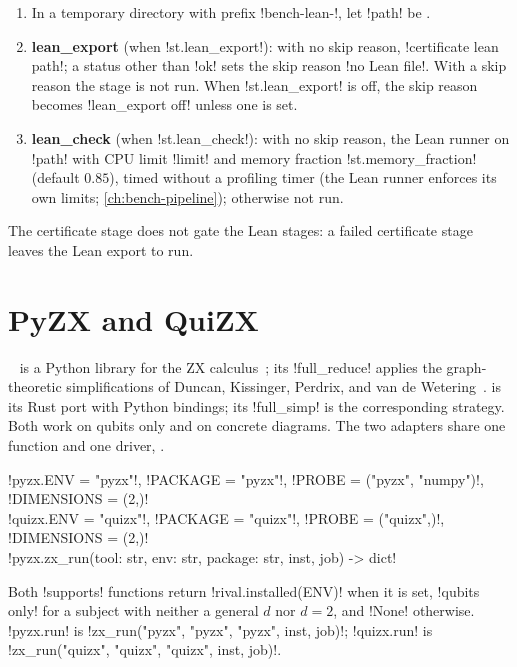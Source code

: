 \begin{algorithm}
\begin{enumerate}
\item In a temporary directory with prefix \code!bench-lean-!, let \code!path! be .
\item \textbf{lean\_export} (when \code!st.lean_export!): with no skip reason, \azx!certificate lean path!; a status other than \code!ok! sets the skip reason \code!no Lean file!. With a skip reason the stage is not run. When \code!st.lean_export! is off, the skip reason becomes \code!lean_export off! unless one is set.
\item \textbf{lean\_check} (when \code!st.lean_check!): with no skip reason, the Lean runner on \code!path! with CPU limit \py!limit! and memory fraction \code!st.memory_fraction! (default $0.85$), timed without a profiling timer (the Lean runner enforces its own limits; \cref{ch:bench-pipeline}); otherwise not run.
\end{enumerate}
The certificate stage does not gate the Lean stages: a failed certificate stage leaves the Lean export to run.
\end{algorithm}

\section{PyZX and QuiZX}\label{sec:bench-tools-pyzx}

~\cite{kissinger2020pyzx} is a Python library for the ZX calculus~\cite{coecke2011interacting}; its \code!full_reduce! applies the graph-theoretic simplifications of Duncan, Kissinger, Perdrix, and van de Wetering~\cite{duncan2020graph}.  is its Rust port with Python bindings; its \code!full_simp! is the corresponding strategy. Both work on qubits only and on concrete diagrams. The two adapters share one function and one driver, .

\begin{signature}
\py!pyzx.ENV = "pyzx"!, \py!PACKAGE = "pyzx"!, \py!PROBE = ("pyzx", "numpy")!, \py!DIMENSIONS = (2,)!\\
\py!quizx.ENV = "quizx"!, \py!PACKAGE = "quizx"!, \py!PROBE = ("quizx",)!, \py!DIMENSIONS = (2,)!\\
\py!pyzx.zx_run(tool: str, env: str, package: str, inst, job) -> dict!
\end{signature}

Both \py!supports! functions return \py!rival.installed(ENV)! when it is set, \code!qubits only! for a subject with neither a general $d$ nor $d=2$, and \py!None! otherwise. \py!pyzx.run! is \py!zx_run("pyzx", "pyzx", "pyzx", inst, job)!; \py!quizx.run! is \py!zx_run("quizx", "quizx", "quizx", inst, job)!.

